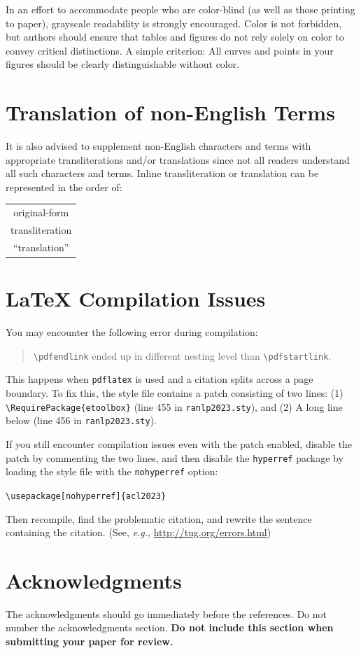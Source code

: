 \documentclass[11pt,a4paper]{article}
\begin{document}
In an effort to accommodate people who are color-blind (as well as those printing to paper), grayscale readability is strongly encouraged.
Color is not forbidden, but authors should ensure that tables and figures do not rely solely on color to convey critical distinctions.
A simple criterion:
All curves and points in your figures should be clearly distinguishable without color.

\section{Translation of non-English Terms}

It is also advised to supplement non-English characters and terms with appropriate transliterations and/or translations since not all readers understand all such characters and terms.
Inline transliteration or translation can be represented in the order of:
\begin{center}
\begin{tabular}{c}
original-form \\
transliteration \\
``translation''
\end{tabular}
\end{center}

\section{\LaTeX{} Compilation Issues}
You may encounter the following error during compilation: 
\begin{quote}
{\small\verb|\pdfendlink|} ended up in different nesting level than {\small\verb|\pdfstartlink|}.
\end{quote}
This happens when \texttt{\small pdflatex} is used and a citation splits across a page boundary.
To fix this, the style file contains a patch consisting of two lines:
(1) {\small\verb|\RequirePackage{etoolbox}|} (line 455 in \texttt{\small ranlp2023.sty}), and
(2) A long line below (line 456 in \texttt{\small ranlp2023.sty}).

If you still encounter compilation issues even with the patch enabled, disable the patch by commenting the two lines, and then disable the \texttt{\small hyperref} package by loading the style file with the \texttt{\small nohyperref} option:

\noindent
{\small\verb|\usepackage[nohyperref]{acl2023}|}

\noindent
Then recompile, find the problematic citation, and rewrite the sentence containing the citation. (See, {\em e.g.}, \url{http://tug.org/errors.html})

\section*{Acknowledgments}

The acknowledgments should go immediately before the references. Do not number the acknowledgments section.
\textbf{Do not include this section when submitting your paper for review.}




\end{document}
